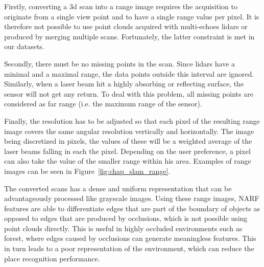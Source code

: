 Firstly, converting a \gls*{3d} scan into a range image requires the acquisition to originate from a single view point and to have a single range value per pixel. It is therefore not possible to use point clouds acquired with multi-echoes \gls*{lidar}s or produced by merging multiple scans. Fortunately, the latter constraint is met in our datasets.

Secondly, there must be no missing points in the scan. Since \gls*{lidar}s have a minimal and a maximal range, the data points outside this interval are ignored. Similarly, when a laser beam hit a highly absorbing or reflecting surface, the sensor will not get any return. To deal with this problem, all missing points are considered as far range (i.e. the maximum range of the sensor). 

Finally, the resolution has to be adjusted so that each pixel of the resulting range image covers the same angular resolution vertically and horizontally. The image being discretized in pixels, the values of these will be a weighted average of the laser beams falling in each the pixel. Depending on the user preference, a pixel can also take the value of the smaller range within his area. Examples of range images can be seen in Figure~\ref{fig:chap_slam_range}.

The converted scans has a dense and uniform representation that can be advantageously processed like grayscale images. Using these range images, NARF features are able to differentiate edges that are part of the boundary of objects as opposed to edges that are produced by occlusions, which is not possible using point clouds directly. This is useful in highly occluded environments such as forest, where edges caused by occlusions can generate meaningless features. This in turn leads to a poor representation of the environment, which can reduce the place recognition performance. 


